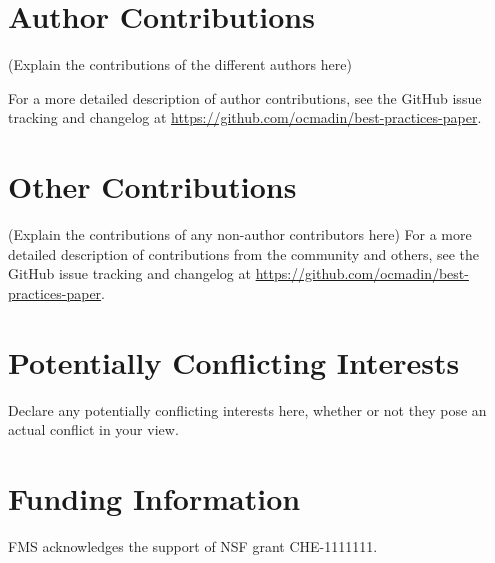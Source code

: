 \documentclass[9pt,bestpractices]{livecoms}
\newcommand{\githubrepository}{\url{https://github.com/ocmadin/best-practices-paper}}  %
\begin{document}
\section{Author Contributions}
%

(Explain the contributions of the different authors here)

For a more detailed description of author contributions,
see the GitHub issue tracking and changelog at \githubrepository.

\section{Other Contributions}
%

(Explain the contributions of any non-author contributors here)
For a more detailed description of contributions from the community and others, see the GitHub issue tracking and changelog at \githubrepository.

\section{Potentially Conflicting Interests}

Declare any potentially conflicting interests here, whether or not they pose an actual conflict in your view.

\section{Funding Information}
FMS acknowledges the support of NSF grant CHE-1111111.




\end{document}
